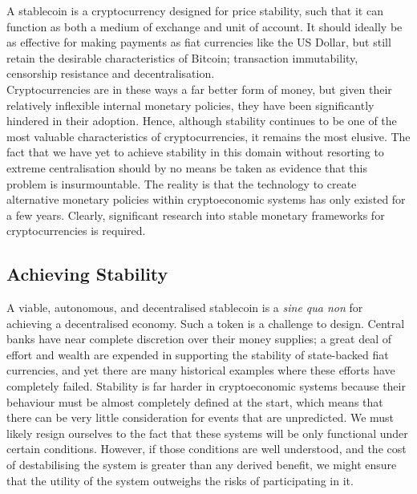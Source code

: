 \noindent A stablecoin is a cryptocurrency designed for price stability, such that it can function as
both a medium of exchange and unit of account. It should ideally be as effective for making payments
as fiat currencies like the US Dollar, but still retain the desirable characteristics of Bitcoin;
transaction immutability, censorship resistance and decentralisation. \\

\noindent Cryptocurrencies are in these ways a far better form of money, but given their relatively inflexible internal
monetary policies, they have been significantly hindered in their adoption. Hence, although stability continues to be one of the most valuable characteristics of cryptocurrencies, it remains the most elusive.
The fact that we have yet to achieve stability in this domain without resorting to extreme
centralisation should by no means be taken as evidence that this problem is insurmountable.
The reality is that the technology to create alternative monetary policies within
cryptoeconomic systems has only existed for a few years. Clearly, significant research into stable monetary
frameworks for cryptocurrencies is required. \\

\subsection{Achieving Stability}

\noindent A viable, autonomous, and decentralised stablecoin is a \textit{sine qua non} for achieving a
decentralised economy.
Such a token is a challenge to design. Central banks have near complete discretion over their money supplies;
a great deal of effort and wealth are expended in supporting the stability of state-backed fiat currencies, 
and yet there are many historical examples where these efforts have completely failed.
Stability is far harder in cryptoeconomic systems because their behaviour must be almost completely
defined at the start, which means that there can be very little consideration for events that are unpredicted.
We must likely resign ourselves to the fact that these systems will be only functional under certain conditions.
However, if those conditions are well understood, and the cost of destabilising the system is greater than
any derived benefit, we might ensure that the utility of the system outweighs the risks of participating in it. \\

